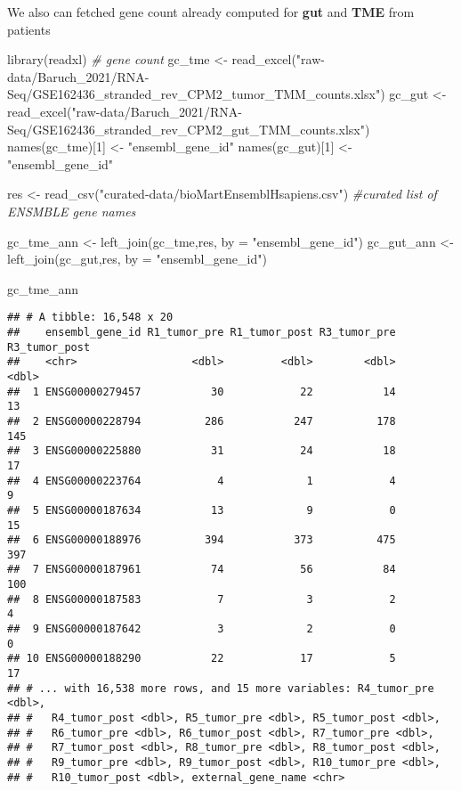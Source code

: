 \documentclass[
]{article}
\newenvironment{Shaded}{\begin{snugshade}}{\end{snugshade}}
\newcommand{\AttributeTok}[1]{\textcolor[rgb]{0.77,0.63,0.00}{#1}}
\newcommand{\CommentTok}[1]{\textcolor[rgb]{0.56,0.35,0.01}{\textit{#1}}}
\newcommand{\DecValTok}[1]{\textcolor[rgb]{0.00,0.00,0.81}{#1}}
\newcommand{\FunctionTok}[1]{\textcolor[rgb]{0.00,0.00,0.00}{#1}}
\newcommand{\NormalTok}[1]{#1}
\newcommand{\OtherTok}[1]{\textcolor[rgb]{0.56,0.35,0.01}{#1}}
\newcommand{\StringTok}[1]{\textcolor[rgb]{0.31,0.60,0.02}{#1}}
\begin{document}
We also can fetched gene count already computed for \textbf{gut} and
\textbf{TME} from patients

\begin{Shaded}
\begin{Highlighting}[]
\FunctionTok{library}\NormalTok{(readxl)}
\CommentTok{\# gene count}
\NormalTok{gc\_tme }\OtherTok{\textless{}{-}} \FunctionTok{read\_excel}\NormalTok{(}\StringTok{"raw{-}data/Baruch\_2021/RNA{-}Seq/GSE162436\_stranded\_rev\_CPM2\_tumor\_TMM\_counts.xlsx"}\NormalTok{)}
\NormalTok{gc\_gut }\OtherTok{\textless{}{-}} \FunctionTok{read\_excel}\NormalTok{(}\StringTok{"raw{-}data/Baruch\_2021/RNA{-}Seq/GSE162436\_stranded\_rev\_CPM2\_gut\_TMM\_counts.xlsx"}\NormalTok{)}
\FunctionTok{names}\NormalTok{(gc\_tme)[}\DecValTok{1}\NormalTok{] }\OtherTok{\textless{}{-}} \StringTok{"ensembl\_gene\_id"}
\FunctionTok{names}\NormalTok{(gc\_gut)[}\DecValTok{1}\NormalTok{] }\OtherTok{\textless{}{-}} \StringTok{"ensembl\_gene\_id"}

\NormalTok{res }\OtherTok{\textless{}{-}} \FunctionTok{read\_csv}\NormalTok{(}\StringTok{"curated{-}data/bioMartEnsemblHsapiens.csv"}\NormalTok{) }\CommentTok{\#curated list of ENSMBLE gene names}

\NormalTok{gc\_tme\_ann }\OtherTok{\textless{}{-}} \FunctionTok{left\_join}\NormalTok{(gc\_tme,res, }\AttributeTok{by =} \StringTok{"ensembl\_gene\_id"}\NormalTok{)}
\NormalTok{gc\_gut\_ann }\OtherTok{\textless{}{-}} \FunctionTok{left\_join}\NormalTok{(gc\_gut,res, }\AttributeTok{by =} \StringTok{"ensembl\_gene\_id"}\NormalTok{)}

\NormalTok{gc\_tme\_ann}
\end{Highlighting}
\end{Shaded}

\begin{verbatim}
## # A tibble: 16,548 x 20
##    ensembl_gene_id R1_tumor_pre R1_tumor_post R3_tumor_pre R3_tumor_post
##    <chr>                  <dbl>         <dbl>        <dbl>         <dbl>
##  1 ENSG00000279457           30            22           14            13
##  2 ENSG00000228794          286           247          178           145
##  3 ENSG00000225880           31            24           18            17
##  4 ENSG00000223764            4             1            4             9
##  5 ENSG00000187634           13             9            0            15
##  6 ENSG00000188976          394           373          475           397
##  7 ENSG00000187961           74            56           84           100
##  8 ENSG00000187583            7             3            2             4
##  9 ENSG00000187642            3             2            0             0
## 10 ENSG00000188290           22            17            5            17
## # ... with 16,538 more rows, and 15 more variables: R4_tumor_pre <dbl>,
## #   R4_tumor_post <dbl>, R5_tumor_pre <dbl>, R5_tumor_post <dbl>,
## #   R6_tumor_pre <dbl>, R6_tumor_post <dbl>, R7_tumor_pre <dbl>,
## #   R7_tumor_post <dbl>, R8_tumor_pre <dbl>, R8_tumor_post <dbl>,
## #   R9_tumor_pre <dbl>, R9_tumor_post <dbl>, R10_tumor_pre <dbl>,
## #   R10_tumor_post <dbl>, external_gene_name <chr>
\end{verbatim}
\end{document}
